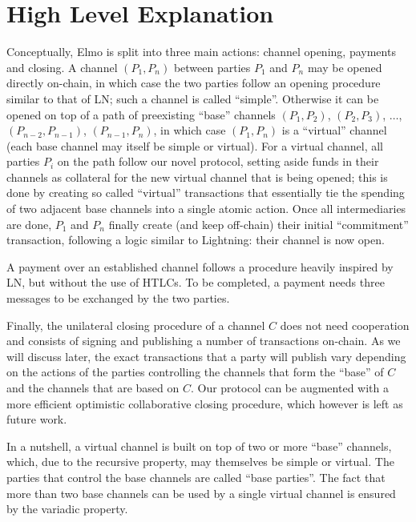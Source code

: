 \section{High Level Explanation}
  Conceptually, Elmo is split into three main actions: channel opening,
  payments and closing. A channel $(P_1, P_n)$ between parties $P_1$ and $P_n$
  may be opened directly on-chain, in which case the two parties follow an
  opening procedure similar to that of LN; such a channel is called ``simple''.
  Otherwise it can be opened on top of a path
  of preexisting ``base'' channels $(P_1, P_2)$, $(P_2, P_3)$, $\dots$, $(P_{n-2},
  P_{n-1})$, $(P_{n-1}, P_{n})$, in which case $(P_1, P_n)$ is a ``virtual''
  channel (each base channel may itself be simple or virtual). For a virtual
  channel, all parties $P_i$ on the
  path follow our novel protocol, setting aside funds in their channels as
  collateral for the new virtual channel that is being opened; this is done
  by creating so called ``virtual'' transactions that essentially tie the
  spending of two adjacent base channels into a single atomic action. Once all
  intermediaries are done, $P_1$ and $P_n$ finally create (and keep
  off-chain) their initial ``commitment'' transaction, following a logic similar
  to Lightning: their channel is now open.

  A payment over an established channel follows a procedure heavily inspired by
  LN, but without the use of HTLCs. To be completed, a payment needs three
  messages to be exchanged by the two parties.

  Finally, the unilateral closing procedure of a channel $C$ does not need
  cooperation and consists of signing and publishing a number of transactions
  on-chain. As
  we will discuss later, the exact transactions that a party will publish vary
  depending on the actions of the parties controlling the channels that form the
  ``base'' of $C$ and the channels that are based on $C$. Our protocol can be
  augmented with a more efficient optimistic collaborative closing procedure,
  which however is left as future work.

  In a nutshell, a virtual channel is built on top of two or more ``base''
  channels, which, due to the recursive property, may themselves be simple or
  virtual. The parties that control the base channels are called ``base
  parties''. The fact that more than two base channels can be used by a single
  virtual channel is ensured by the variadic property.

